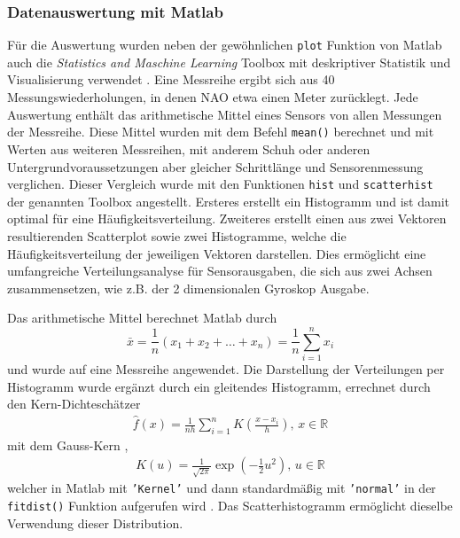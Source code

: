 \subsubsection*{Datenauswertung mit Matlab}
Für die Auswertung wurden neben der gewöhnlichen \texttt{plot} Funktion von Matlab \cite{matlab} auch die \textit{Statistics and Maschine Learning} Toolbox mit deskriptiver Statistik und Visualisierung verwendet \cite{toolbox}. 
Eine Messreihe ergibt sich aus 40 Messungswiederholungen, in denen NAO etwa einen Meter zurücklegt. Jede Auswertung enthält das arithmetische Mittel eines Sensors von allen Messungen der Messreihe. Diese Mittel wurden mit dem Befehl \texttt{mean()} berechnet und mit Werten aus weiteren Messreihen, mit anderem Schuh oder anderen Untergrundvoraussetzungen aber gleicher Schrittlänge und Sensorenmessung verglichen. Dieser Vergleich wurde mit den Funktionen \texttt{hist} und \texttt{scatterhist} der genannten Toolbox angestellt. Ersteres erstellt ein Histogramm und ist damit optimal für eine Häufigkeitsverteilung. Zweiteres erstellt einen aus zwei Vektoren resultierenden Scatterplot sowie zwei Histogramme, welche die Häufigkeitsverteilung der jeweiligen Vektoren darstellen. Dies ermöglicht eine umfangreiche Verteilungsanalyse für Sensorausgaben, die sich aus zwei Achsen zusammensetzen, wie z.B. der 2 dimensionalen Gyroskop Ausgabe.

Das arithmetische Mittel berechnet Matlab durch \cite[S.50]{statistik_Ludwig}
\begin{equation}
	\bar{x} = \frac{1}{n} (x_1 + x_2 + \dots + x_n) = \frac{1}{n}\sum_{i=1}^{n}x_i
\end{equation}
und wurde auf eine Messreihe angewendet. Die Darstellung der Verteilungen per Histogramm wurde ergänzt durch ein gleitendes Histogramm, errechnet durch den Kern-Dichteschätzer \cite[S.93]{statistik_Ludwig}
\begin{align}
	\hat{f}(x)=\frac{1}{nh} \sum_{i=1}^{n}K\left(\frac{x - x_i}{h}\right),\, x \in \mathds{R}
\end{align}
mit dem Gauss-Kern \cite[S.93]{statistik_Ludwig}, 
\begin{align}
	K(u) = \frac{1}{\sqrt{2\pi}} \exp\left(-\frac{1}{2}u^2\right),\, u \in \mathds{R}
\end{align}
welcher in Matlab mit \texttt{'Kernel'} und dann standardmäßig mit \texttt{'normal'} in der \texttt{fitdist()} Funktion aufgerufen wird \cite{kernel-distribution} \cite{fitdist}. Das Scatterhistogramm ermöglicht dieselbe Verwendung dieser Distribution. 


